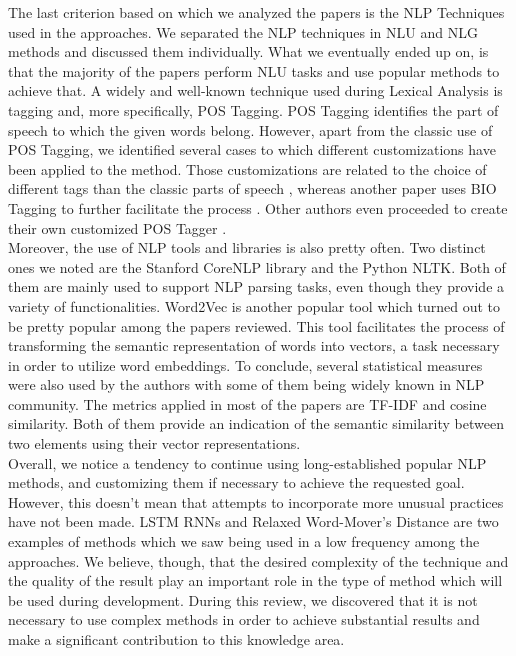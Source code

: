 The last criterion based on which we analyzed the papers is the NLP Techniques used in the approaches. We separated the NLP techniques in NLU and NLG methods and discussed them individually. What we eventually 
ended up on, is that the majority of the papers perform NLU tasks and use popular methods to achieve that. A widely and well-known technique used during Lexical Analysis is tagging and, more specifically, POS Tagging. 
POS Tagging identifies the part of speech to which the given words belong. However, apart from the classic use of POS Tagging, we identified several cases to which different customizations have been applied to the method. 
Those customizations are related to the choice of different tags than the classic parts of speech \cite{9240680}, whereas another paper uses BIO Tagging to further facilitate the process \cite{pedemonte2012towards}. 
Other authors even proceeded to create their own customized POS Tagger \cite{carvalho2014nat2testscr}.\\
Moreover, the use of NLP tools and libraries is also pretty often. Two distinct ones we noted are the Stanford CoreNLP library and the Python NLTK. Both of them are mainly used to support NLP parsing tasks, even though 
they provide a variety of functionalities. Word2Vec is another popular tool which turned out to be pretty popular among the papers reviewed. This tool facilitates the process of transforming the semantic representation of 
words into vectors, a task necessary in order to utilize word embeddings. To conclude, several statistical measures were also used by the authors with some of them being widely known in NLP community. The metrics applied 
in most of the papers are TF-IDF and cosine similarity. Both of them provide an indication of the semantic similarity between two elements using their vector representations.\\
Overall, we notice a tendency to continue using long-established popular NLP methods, and customizing them if necessary to achieve the requested goal. However, this doesn't mean that attempts to incorporate more unusual 
practices have not been made. LSTM RNNs and Relaxed Word-Mover's Distance are two examples of methods which we saw being used in a low frequency among the approaches. We believe, though, that the desired complexity 
of the technique and the quality of the result play an important role in the type of method which will be used during development. During this review, we discovered that it is not necessary to use complex methods in 
order to achieve substantial results and make a significant contribution to this knowledge area.
